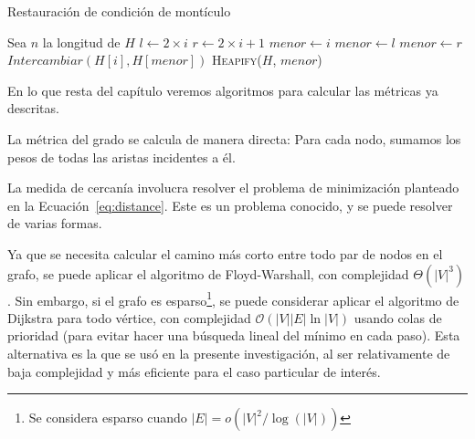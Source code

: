 \documentclass[journal]{IEEEtran}
\let\MYoriglatexcaption\caption
\renewcommand{\caption}[2][\relax]{\MYoriglatexcaption[#2]{#2}}
\begin{document}
\begin{algorithm}[H]
	\caption{Restauración de condición de montículo} \label{alg:heapify}
	\begin{algorithmic}
		\State Sea $n$ la longitud de $H$
		\State $l \gets 2\times i$
		\State $r \gets 2\times i + 1$
		\State $menor \gets i$ 
		\State $menor \gets l$
		\EndIf
		\State $menor \gets r$
		\EndIf
		 
		\State $Intercambiar(H[i], H[menor])$
		\State \textsc{Heapify}($H$, $menor$)
		\EndIf
		\EndFunction
	\end{algorithmic}
\end{algorithm}

En lo que resta del capítulo veremos algoritmos para calcular las métricas ya descritas.

La métrica del grado se calcula de manera directa: Para cada nodo, sumamos los pesos de todas las aristas incidentes a él.

La medida de cercanía involucra resolver el problema de minimización planteado en la Ecuación~\ref{eq:distance}. Este es un problema conocido, y se puede resolver de varias formas.

Ya que se necesita calcular el camino más corto entre todo par de nodos en el grafo, se puede aplicar el algoritmo de Floyd-Warshall, con complejidad \(\Theta(|V|^3)\) \cite{clrs}. Sin embargo, si el grafo es esparso\footnote{Se considera esparso cuando \(|E| = o(|V|^2 / \log(|V|))\)\cite{clrs}}, se puede considerar aplicar el algoritmo de Dijkstra para todo vértice, con complejidad \(\mathcal{O}(|V||E|\ln |V|)\) usando colas de prioridad (para evitar hacer una búsqueda lineal del mínimo en cada paso). Esta alternativa es la que se usó en la presente investigación, al ser relativamente de baja complejidad y más eficiente para el caso particular de interés.
\end{document}
